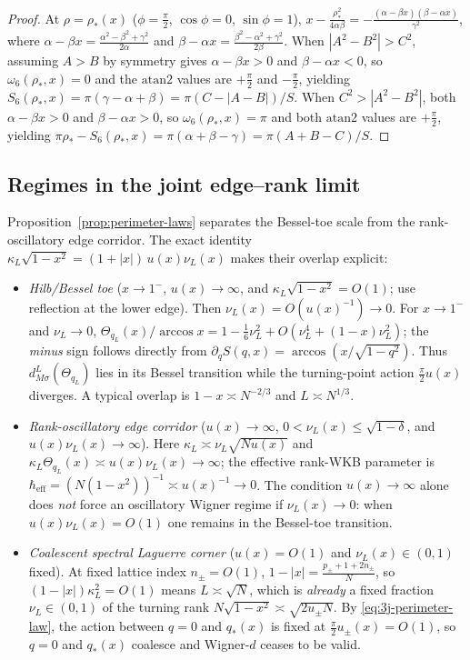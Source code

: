 \documentclass[11pt]{article}
\theoremstyle{definition}
\theoremstyle{remark}
\newcommand{\heff}{\hbar_{\mathrm{eff}}}
\newcommand{\atanTwo}{\mathrm{atan2}}
\renewcommand{\_}{\oldunderscore\penalty0\hskip0pt\relax}
\begin{document}
\begin{proof}
At $\rho=\rho_*(x)$ ($\phi=\frac{\pi}{2}$, $\cos\phi=0$, $\sin\phi=1$), $x-\frac{\rho_*^2}{4\alpha\beta}=-\frac{(\alpha-\beta
  x)(\beta-\alpha x)}{\gamma^2}$, where $\alpha-\beta x=\frac{\alpha^2-\beta^2+\gamma^2}{2\alpha}$ and $\beta-\alpha
  x=\frac{\beta^2-\alpha^2+\gamma^2}{2\beta}$. When $|A^2-B^2|>C^2$, assuming $A>B$ by symmetry gives $\alpha-\beta x>0$ and
  $\beta-\alpha x<0$, so $\omega_6(\rho_*,x)=0$ and the $\atanTwo$ values are $+\frac{\pi}{2}$ and $-\frac{\pi}{2}$, yielding
  $S_6(\rho_*,x)=\pi(\gamma-\alpha+\beta)=\pi(C-|A-B|)/S$. When $C^2>|A^2-B^2|$, both $\alpha-\beta x>0$ and $\beta-\alpha x>0$,
  so $\omega_6(\rho_*,x)=\pi$ and both $\atanTwo$ values are $+\frac{\pi}{2}$, yielding
  $\pi\rho_*-S_6(\rho_*,x)=\pi(\alpha+\beta-\gamma)=\pi(A+B-C)/S$.
\end{proof}

\subsection{Regimes in the joint edge--rank limit}
Proposition~\ref{prop:perimeter-laws} separates the Bessel-toe scale from the rank-oscillatory edge corridor. The exact identity
$\kappa_L\sqrt{1-x^2}=(1+|x|)\,u(x)\nu_L(x)$ makes their overlap explicit:
\begin{itemize}[leftmargin=2em,itemsep=2pt]
\item \emph{Hilb/Bessel toe} ($x\to 1^-$, $u(x)\to\infty$, and $\kappa_L\sqrt{1-x^2}=O(1)$; use reflection at the lower
  edge). Then $\nu_L(x)=O(u(x)^{-1})\to0$. For $x\to1^-$ and $\nu_L\to0$,
  $\Theta_{q_L}(x)/\arccos x=1-\frac16\nu_L^2+O(\nu_L^4+(1-x)\nu_L^2)$; the \emph{minus} sign follows directly from
  $\partial_q S(q,x)=\arccos(x/\sqrt{1-q^2})$. Thus $d^L_{M\sigma}(\Theta_{q_L})$ lies in its Bessel transition while the
  turning-point action $\frac{\pi}{2}u(x)$ diverges. A typical overlap is $1-x\asymp N^{-2/3}$ and $L\asymp N^{1/3}$.
\item \emph{Rank-oscillatory edge corridor} ($u(x)\to\infty$, $0<\nu_L(x)\le\sqrt{1-\delta}$, and $u(x)\nu_L(x)\to\infty$).
  Here $\kappa_L\asymp\nu_L\sqrt{N u(x)}$ and $\kappa_L\Theta_{q_L}(x)\asymp u(x)\nu_L(x)\to\infty$; the effective rank-WKB
  parameter is $\heff=(N(1-x^2))^{-1}\asymp u(x)^{-1}\to0$. The condition $u(x)\to\infty$ alone does \emph{not} force an
  oscillatory Wigner regime if $\nu_L(x)\to0$: when $u(x)\nu_L(x)=O(1)$ one remains in the Bessel-toe transition.
\item \emph{Coalescent spectral Laguerre corner} ($u(x)=O(1)$ and $\nu_L(x)\in(0,1)$ fixed). At fixed lattice index
  $n_\pm=O(1)$, $1-|x|=\frac{p_\pm+1+2n_\pm}{N}$, so $(1-|x|)\kappa_L^2=O(1)$ means $L\asymp\sqrt{N}$, which is \emph{already} a
  fixed fraction $\nu_L\in(0,1)$ of the turning rank $N\sqrt{1-x^2}\asymp\sqrt{2u_\pm N}$. By \eqref{eq:3j-perimeter-law}, the
  action between $q=0$ and $q_*(x)$ is fixed at $\frac{\pi}{2}u_\pm(x)=O(1)$, so $q=0$ and $q_*(x)$ coalesce and Wigner-$d$
  ceases to be valid.
\end{itemize}
\end{document}
